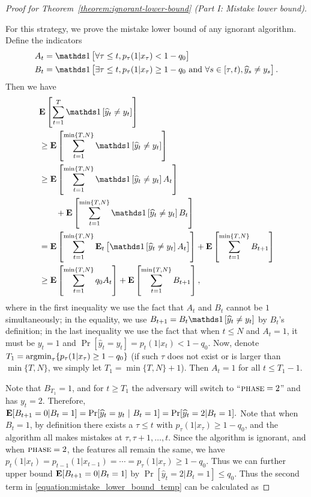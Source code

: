 \begin{proof}[Proof for Theorem~\ref{theorem:ignorant-lower-bound} (Part I: Mistake lower bound)]
\begin{algorithm}[h]
\begin{algorithmic}[1]
{}
\end{algorithmic}
\end{algorithm}
For this strategy, we prove the mistake lower bound of any ignorant algorithm.
Define the indicators
\begin{align*}
A_t &= \indicator{\forall \tau\le t, p_\tau(1|x_\tau)<1-q_0} \\
B_t &= \indicator{\exists \tau\le t, p_\tau(1|x_\tau)\ge 1-q_0
 \text{\ and\ } \forall s\in[\tau,t), \widehat y_s \neq y_s}.
\end{align*}
Then we have
\begin{align}
& \mathbf{E}\left[\sum_{t=1}^{T} \indicator{\widehat y_t\neq y_t}\right] \nonumber \\
& \ge \mathbf{E}\left[\sum_{t=1}^{\min\{T,N\}} \indicator{\widehat y_t\neq y_t}\right] \nonumber \\
& \ge \mathbf{E}\left[\sum_{t=1}^{\min\{T,N\}} \indicator{\widehat y_t\neq y_t}A_t\right] \nonumber \\
& \qquad + \mathbf{E}\left[\sum_{t=1}^{\min\{T,N\}} \indicator{\widehat y_t\neq y_t}B_t\right] \nonumber \\
& = \mathbf{E}\left[\sum_{t=1}^{\min\{T,N\}} \mathbf{E}_t\left[\indicator{\widehat y_t\neq y_t}A_t\right]\right] + \mathbf{E}\left[\sum_{t=1}^{\min\{T,N\}} B_{t+1}\right] \nonumber \\
& \ge \mathbf{E}\left[\sum_{t=1}^{\min\{T,N\}} q_0 A_t\right] + \mathbf{E}\left[\sum_{t=1}^{\min\{T,N\}} B_{t+1}\right],
\label{equation:mistake_lower_bound_temp}
\end{align}
where in the first inequality we use the fact that $A_t$ and $B_t$ cannot be $1$ simultaneously; in the equality, we use
$B_{t+1}=B_t\indicator{\widehat y_t\neq y_t}$ by $B_t$'s definition; in the last
inequality we use the fact that when $t\le N$ and $A_t=1$, it must be $y_t=1$ and $\Pr[\widehat y_t=y_t]=p_t(1|x_t)<1-q_0$.
Now, denote $T_1 = \operatorname*{argmin}_{\tau} \{ p_\tau(1|x_\tau) \ge 1-q_0 \}$ (if such
$\tau$ does not exist or is larger than $\min\{T,N\}$, we simply let
$T_1=\min\{T,N\}+1$). Then $A_t=1$ for all $t\le T_1-1$.

Note that $B_{T_1}=1$, and for $t \geq T_1$ the adversary will switch to ``$\textsc{phase}=2$'' and has $y_t=2$. Therefore, 
$\operatorname*{\mathbf{E}}[B_{t+1}=0|B_{t}=1]=\Pr[\widehat y_t=y_t~|~B_t=1] = \Pr[\widehat y_t=2|B_t=1].$ 
Note that when $B_t=1$, by definition there exists a $\tau\le t$ with $p_\tau(1|x_\tau)\ge 1-q_0$, 
and the algorithm all makes mistakes at $\tau, \tau+1, \ldots, t$. Since the algorithm is ignorant, and when $\textsc{phase}=2$, 
the features all remain the same, we have $p_t(1|x_t)=p_{t-1}(1|x_{t-1})=\cdots=p_\tau(1|x_\tau)\ge 1-q_0$. 
Thus we can further upper bound $\operatorname*{\mathbf{E}}[B_{t+1}=0|B_{t}=1]$ by $\Pr[\widehat y_t=2|B_t=1]\leq q_0$. Thus the second term in
\eqref{equation:mistake_lower_bound_temp} can be calculated as


\end{proof}
